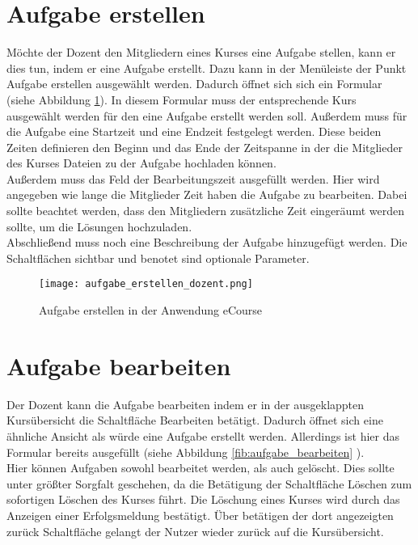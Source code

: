 \section{Aufgabe erstellen}
Möchte der Dozent den Mitgliedern eines Kurses eine Aufgabe stellen, kann er dies tun, indem er eine Aufgabe erstellt. Dazu kann in der Menüleiste der Punkt \glqq Aufgabe erstellen\grqq\; ausgewählt werden. Dadurch öffnet sich sich ein Formular (siehe Abbildung \ref{fib:aufgabe_anlegen}). 
In diesem Formular muss der entsprechende Kurs ausgewählt werden für den eine Aufgabe erstellt werden soll. Außerdem muss für die Aufgabe eine Startzeit und eine Endzeit festgelegt werden. Diese beiden Zeiten definieren den Beginn und das Ende der Zeitspanne in der die Mitglieder des Kurses Dateien zu der Aufgabe hochladen können. \\
Außerdem muss das Feld der Bearbeitungszeit ausgefüllt werden. Hier wird angegeben wie lange die Mitglieder Zeit haben die Aufgabe zu bearbeiten. Dabei sollte beachtet werden, dass den Mitgliedern zusätzliche Zeit eingeräumt werden sollte, um die Lösungen hochzuladen.\\
Abschließend muss noch eine Beschreibung der Aufgabe hinzugefügt werden. 
Die Schaltflächen \glqq sichtbar\grqq{} und \glqq benotet\grqq{} sind optionale Parameter.

\begin{figure}[h]
\centering
\texttt{[image: aufgabe\_erstellen\_dozent.png]}
\caption{Aufgabe erstellen in der Anwendung eCourse}
\label{fib:aufgabe_anlegen}
\end{figure}


\section{Aufgabe bearbeiten}
\label{sec:bearbeiten}
Der Dozent kann die Aufgabe bearbeiten indem er in der ausgeklappten Kursübersicht die Schaltfläche \glqq Bearbeiten\grqq{} betätigt. Dadurch öffnet sich eine ähnliche Ansicht als würde eine Aufgabe erstellt werden. Allerdings ist hier das Formular bereits ausgefüllt (siehe Abbildung \ref{fib:aufgabe_bearbeiten} ).\\
Hier können Aufgaben sowohl bearbeitet werden, als auch gelöscht. 
Dies sollte unter größter Sorgfalt geschehen, da die Betätigung der Schaltfläche \glqq Löschen\grqq{} zum sofortigen Löschen des Kurses führt. Die Löschung eines Kurses wird durch das Anzeigen einer Erfolgsmeldung bestätigt. Über betätigen der dort angezeigten \glqq zurück\grqq{} Schaltfläche gelangt der Nutzer wieder zurück auf die Kursübersicht.

